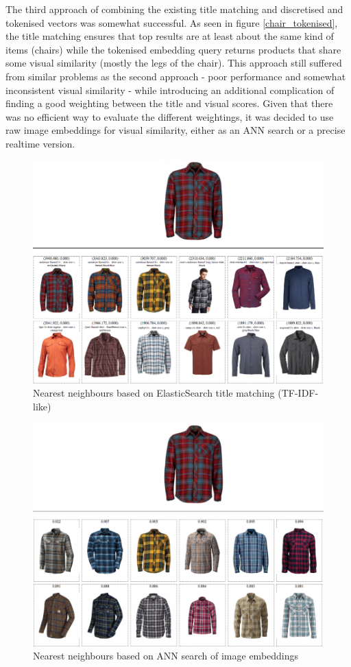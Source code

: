 The third approach of combining the existing title matching and discretised and tokenised vectors was somewhat successful.
As seen in figure \ref{chair_tokenised}, the title matching ensures that top results are at least about the same kind of items (chairs) while the tokenised embedding query returns products that share some visual similarity (mostly the legs of the chair).
This approach still suffered from similar problems as the second approach - poor performance and somewhat inconsistent visual similarity - while introducing an additional complication of finding a good weighting between the title and visual scores.
Given that there was no efficient way to evaluate the different weightings, it was decided to use raw image embeddings for visual similarity, either as an ANN search or a precise realtime version.

\begin{figure}
  \centering
  \includegraphics[width=0.8\linewidth]{figures/compare/shirt_es}
  \caption{Nearest neighbours based on ElasticSearch title matching (TF-IDF-like)}
  \label{shirt_es}
\end{figure}
\begin{figure}
  \centering
  \includegraphics[width=0.8\linewidth]{figures/compare/shirt_nmslib}
  \caption{Nearest neighbours based on ANN search of image embeddings}
  \label{shirt_nmslib}
\end{figure}


